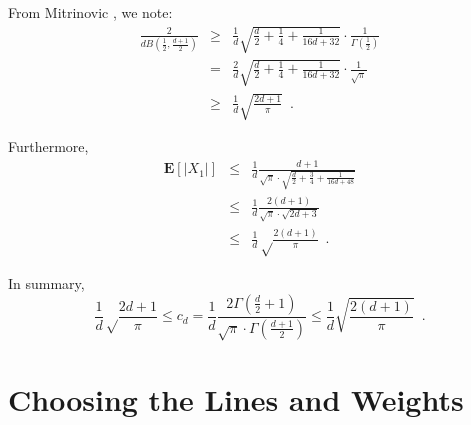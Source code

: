 \documentclass[charterfonts,lotsofwhite]{patmorin}
\newcommand{\E}{\mathbf{E}}
\begin{document}
From Mitrinovic \cite[p.~286]{m70}, we note:
\begin{eqnarray}
\frac{2}{dB(\frac{1}{2},\frac{d+1}{2})} & \ge &
  \frac{1}{d}\sqrt{\frac{d}{2}+\frac{1}{4}+\frac{1}{16d+32}}\cdot 
     \frac{1}{\Gamma(\frac{1}{2})} \\
 & = & \frac{2}{d}\sqrt{\frac{d}{2}+\frac{1}{4}+\frac{1}{16d+32}}\cdot
      \frac{1}{\sqrt{\pi}} \\
 & \ge & \frac{1}{d}\sqrt{\frac{2d+1}{\pi}} \enspace .
\end{eqnarray}

Furthermore,
\begin{eqnarray*}
\E\left[|X_1|\right] 
  & \le & \frac{1}{d}\frac{d+1}{\sqrt{\pi}\cdot\sqrt{\frac{d}{2}+
                       \frac{3}{4}+\frac{1}{16d+48}}} \\
  & \le & \frac{1}{d}\frac{2(d+1)}{\sqrt{\pi}\cdot\sqrt{2d+3}} \\ 
  & \le & \frac{1}{d}\sqrt\frac{2(d+1)}{\pi} \enspace . 
\end{eqnarray*}

In summary,
\[
\frac{1}{d}\sqrt\frac{2d+1}{\pi} \le c_d = \frac{1}{d}\frac{2\Gamma(\frac{d}{2}+1)}
                            {\sqrt{\pi}\cdot\Gamma(\frac{d+1}{2})}
 \le \frac{1}{d}\sqrt{\frac{2(d+1)}{\pi}} \enspace .
\]

\section{Choosing the Lines and Weights}
\newcommand{\ccap}{\mathrm{cap}}
\newcommand{\Sd}{\mathbb{S}^{d-1}}
\newcommand{\area}{\mathrm{vol}}
\end{document}

